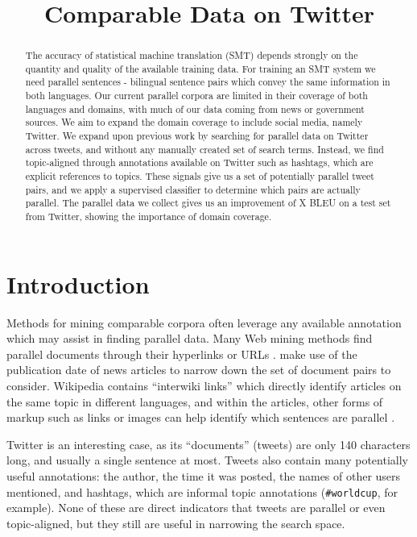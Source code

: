 \documentclass[11pt,letterpaper]{article}
\title{Comparable Data on Twitter}
\author{
\anonymize{
Author 1\\
	    XYZ Company\\
	    111 Anywhere Street\\
	    Mytown, NY 10000, USA\\
	    {\tt author1@xyz.org}
	  \And
	Author 2\\
  	ABC University\\
  	900 Main Street\\
  	Ourcity, PQ, Canada A1A 1T2\\
  {\tt author2@abc.ca}
}}
\date{}
\begin{document}
\maketitle
\begin{abstract}
The accuracy of statistical machine translation (SMT) depends strongly on the
quantity and quality of the available training data. For training an SMT system
we need parallel sentences - bilingual sentence pairs which
convey the same information in both languages. Our current parallel corpora
are limited in their coverage of both languages and domains, with much of our
data coming from news or government sources. We aim to expand the domain
coverage to include social media, namely Twitter. We expand upon previous work
by searching for parallel data on Twitter across tweets, and without
any manually created set of search terms. Instead, we find topic-aligned
through annotations available on Twitter such as hashtags, which are explicit
references to topics.
These signals give us a set of potentially parallel tweet pairs, and we apply a
supervised classifier to determine which pairs are actually parallel. 
The parallel data we collect gives us an improvement of X BLEU on a test set
from Twitter, showing the importance of domain coverage.
\end{abstract}

\section{Introduction}

Methods for mining comparable corpora often leverage any available annotation
which may assist in finding parallel data. 
Many Web mining methods find parallel documents through their hyperlinks or
URLs \cite{Nie99,Chen00,Resnik99,Resnik03,Smith13}.  make use of the
publication date of news articles to narrow down the set of document pairs to
consider. Wikipedia contains ``interwiki links'' which directly identify
articles on the same topic in different languages, and within the articles,
other forms of markup such as links or images can help identify which
sentences are parallel \cite{Smith10}.

Twitter is an interesting case, as its ``documents'' (tweets) are only 140 characters
long, and usually a single sentence at most. Tweets also contain many
potentially useful annotations: the author, the time it was posted, the names of
other users mentioned, and hashtags, which are informal topic annotations
({\tt \#worldcup}, for example). None of these are direct indicators that tweets
are parallel or even topic-aligned, but they still are useful in narrowing
the search space. 
\end{document}

